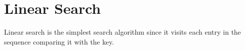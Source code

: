\chapter{Linear Search}

Linear search is the simplest search algorithm since it visits each
entry in the sequence comparing it with the key.